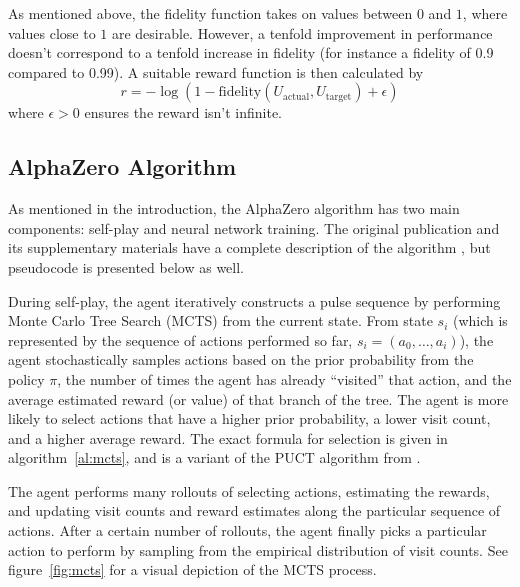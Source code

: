 As mentioned above, the fidelity function takes on values between $0$ and $1$, where values close to $1$ are desirable.
However, a tenfold improvement in performance doesn't correspond to a tenfold increase in fidelity (for instance a fidelity of 0.9 compared to 0.99). A suitable reward function is then calculated by
\begin{equation}
    r = -\log(1-\text{fidelity}(U_\text{actual}, U_\text{target}) + \epsilon)
\end{equation}
where $\epsilon>0$ ensures the reward isn't infinite.

\subsection{AlphaZero Algorithm}

As mentioned in the introduction, the AlphaZero algorithm has two main components: self-play and neural network training. The original publication and its supplementary materials have a complete description of the algorithm \cite{Silver1140}, but pseudocode is presented below as well.

During self-play, the agent iteratively constructs a pulse sequence by performing Monte Carlo Tree Search (MCTS) from the current state. From state $s_i$ (which is represented by the sequence of actions performed so far, $s_i = (a_0, \dots, a_i)$), the agent stochastically samples actions based on the prior probability from the policy $\pi$, the number of times the agent has already ``visited'' that action, and the average estimated reward (or value) of that branch of the tree. The agent is more likely to select actions that have a higher prior probability, a lower visit count, and a higher average reward. The exact formula for selection is given in algorithm~\ref{al:mcts},
and is a variant of the PUCT algorithm from \cite{Rosin:2011uu}.

The agent performs many rollouts of selecting actions, estimating the rewards, and updating visit counts and reward estimates along the particular sequence of actions. After a certain number of rollouts, the agent finally picks a particular action to perform by sampling from the empirical distribution of visit counts.
See figure~\ref{fig:mcts} for a visual depiction of the MCTS process.


